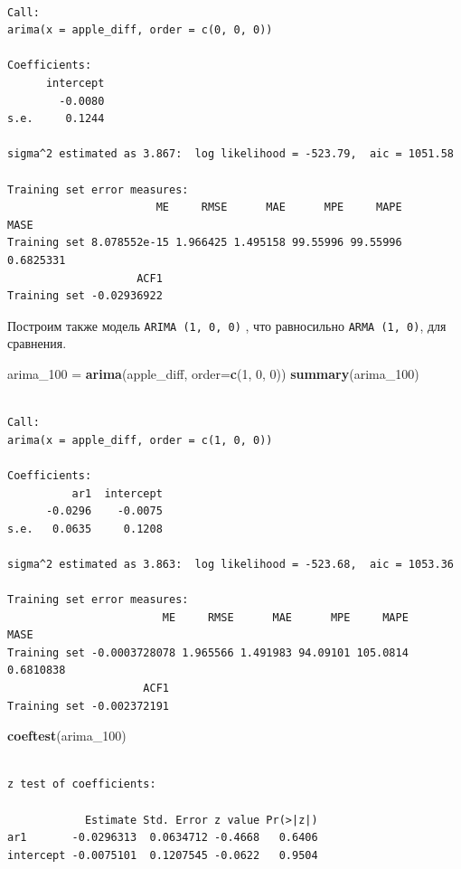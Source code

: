 \documentclass[]{book}
\newenvironment{Shaded}{\begin{snugshade}}{\end{snugshade}}
\newcommand{\DataTypeTok}[1]{\textcolor[rgb]{0.13,0.29,0.53}{#1}}
\newcommand{\DecValTok}[1]{\textcolor[rgb]{0.00,0.00,0.81}{#1}}
\newcommand{\KeywordTok}[1]{\textcolor[rgb]{0.13,0.29,0.53}{\textbf{#1}}}
\newcommand{\NormalTok}[1]{#1}
\newcommand{\StringTok}[1]{\textcolor[rgb]{0.31,0.60,0.02}{#1}}
\begin{document}
\begin{verbatim}

Call:
arima(x = apple_diff, order = c(0, 0, 0))

Coefficients:
      intercept
        -0.0080
s.e.     0.1244

sigma^2 estimated as 3.867:  log likelihood = -523.79,  aic = 1051.58

Training set error measures:
                       ME     RMSE      MAE      MPE     MAPE      MASE
Training set 8.078552e-15 1.966425 1.495158 99.55996 99.55996 0.6825331
                    ACF1
Training set -0.02936922
\end{verbatim}

Построим также модель \texttt{ARIMA\ (1,\ 0,\ 0)} , что равносильно \texttt{ARMA\ (1,\ 0)}, для сравнения.

\begin{Shaded}
\begin{Highlighting}[]
\NormalTok{arima_}\DecValTok{100}\NormalTok{ =}\StringTok{ }\KeywordTok{arima}\NormalTok{(apple_diff, }\DataTypeTok{order=}\KeywordTok{c}\NormalTok{(}\DecValTok{1}\NormalTok{, }\DecValTok{0}\NormalTok{, }\DecValTok{0}\NormalTok{))}
\KeywordTok{summary}\NormalTok{(arima_}\DecValTok{100}\NormalTok{)}
\end{Highlighting}
\end{Shaded}

\begin{verbatim}

Call:
arima(x = apple_diff, order = c(1, 0, 0))

Coefficients:
          ar1  intercept
      -0.0296    -0.0075
s.e.   0.0635     0.1208

sigma^2 estimated as 3.863:  log likelihood = -523.68,  aic = 1053.36

Training set error measures:
                        ME     RMSE      MAE      MPE     MAPE      MASE
Training set -0.0003728078 1.965566 1.491983 94.09101 105.0814 0.6810838
                     ACF1
Training set -0.002372191
\end{verbatim}

\begin{Shaded}
\begin{Highlighting}[]
\KeywordTok{coeftest}\NormalTok{(arima_}\DecValTok{100}\NormalTok{)}
\end{Highlighting}
\end{Shaded}

\begin{verbatim}

z test of coefficients:

            Estimate Std. Error z value Pr(>|z|)
ar1       -0.0296313  0.0634712 -0.4668   0.6406
intercept -0.0075101  0.1207545 -0.0622   0.9504
\end{verbatim}
\end{document}

